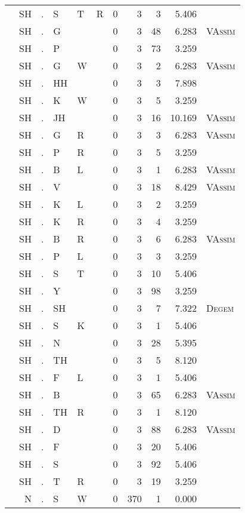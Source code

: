 \begin{longtable}{r@{ } r@{ } c@{ } l@{ } l@{ } l@{ } r r r r l }
 & SH & . & S & T & R & 0 & 3 & 3 & 5.406 &  \\
 & SH & . & G &  &  & 0 & 3 & 48 & 6.283 & \textsc{VAssim} \\
 & SH & . & P &  &  & 0 & 3 & 73 & 3.259 &  \\
 & SH & . & G & W &  & 0 & 3 & 2 & 6.283 & \textsc{VAssim} \\
 & SH & . & HH &  &  & 0 & 3 & 3 & 7.898 &  \\
 & SH & . & K & W &  & 0 & 3 & 5 & 3.259 &  \\
 & SH & . & JH &  &  & 0 & 3 & 16 & 10.169 & \textsc{VAssim} \\
 & SH & . & G & R &  & 0 & 3 & 3 & 6.283 & \textsc{VAssim} \\
 & SH & . & P & R &  & 0 & 3 & 5 & 3.259 &  \\
 & SH & . & B & L &  & 0 & 3 & 1 & 6.283 & \textsc{VAssim} \\
 & SH & . & V &  &  & 0 & 3 & 18 & 8.429 & \textsc{VAssim} \\
 & SH & . & K & L &  & 0 & 3 & 2 & 3.259 &  \\
 & SH & . & K & R &  & 0 & 3 & 4 & 3.259 &  \\
 & SH & . & B & R &  & 0 & 3 & 6 & 6.283 & \textsc{VAssim} \\
 & SH & . & P & L &  & 0 & 3 & 3 & 3.259 &  \\
 & SH & . & S & T &  & 0 & 3 & 10 & 5.406 &  \\
 & SH & . & Y &  &  & 0 & 3 & 98 & 3.259 &  \\
 & SH & . & SH &  &  & 0 & 3 & 7 & 7.322 & \textsc{Degem} \\
 & SH & . & S & K &  & 0 & 3 & 1 & 5.406 &  \\
 & SH & . & N &  &  & 0 & 3 & 28 & 5.395 &  \\
 & SH & . & TH &  &  & 0 & 3 & 5 & 8.120 &  \\
 & SH & . & F & L &  & 0 & 3 & 1 & 5.406 &  \\
 & SH & . & B &  &  & 0 & 3 & 65 & 6.283 & \textsc{VAssim} \\
 & SH & . & TH & R &  & 0 & 3 & 1 & 8.120 &  \\
 & SH & . & D &  &  & 0 & 3 & 88 & 6.283 & \textsc{VAssim} \\
 & SH & . & F &  &  & 0 & 3 & 20 & 5.406 &  \\
 & SH & . & S &  &  & 0 & 3 & 92 & 5.406 &  \\
 & SH & . & T & R &  & 0 & 3 & 19 & 3.259 &  \\
 & N & . & S & W &  & 0 & 370 & 1 & 0.000 &  \\

\end{longtable}
